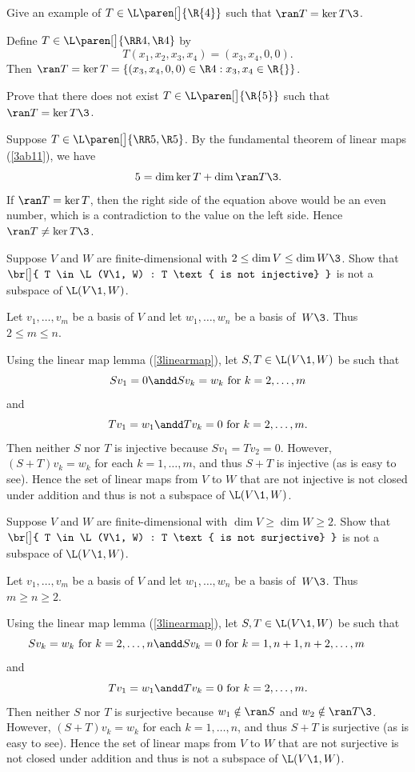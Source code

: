 \exercise
Give an example of $T \in \L\paren[\big]{\R{4}}$ such that $\ran T = \ker T\3$.

\begin{Solution}
Define $T \in \L\paren[\big]{\RR4, \R4}$ by
\[
T(x_1, x_2, x_3, x_4) = (x_3, x_4, 0, 0).
\]
Then $\ran T = \ker T = \{ (x_3, x_4, 0, 0) \in \R4: x_3, x_4 \in \R{} \}$.
\end{Solution}

\exercise
Prove that there does not exist $T \in \L\paren[\big]{\R{5}}$ such that $\ran T = \ker T\3$.

\begin{Solution}
Suppose $T \in \L\paren[\big]{\RR5, \R5}$. By the fundamental theorem of linear maps (\ref{3ab11}), we have
\[
5 = \dim \ker T + \dim \ran T\3.
\]
If $\ran T = \ker T$, then the right side of the equation above would be an even number, which is a contradiction to the value on the left side. Hence $\ran T \ne \ker T\3$.
\end{Solution}

\exercise
Suppose $V$ and $W$ are finite-dimensional with $2 \le \dim V \le \dim W\3$. Show that
$
\br[\big]{ T \in \L(V\1, W) : T \text{ is not injective} }
$
is not a subspace of $\L(V\1, W)$.

\begin{Solution}
Let $v_1, \dots, v_m$ be a basis of $V$ and let $w_1, \dots, w_n$ be a basis of~$W\3$. Thus $2 \le m \le n$.

Using the linear map lemma (\ref{3linearmap}), let $S, T \in \L(V\1, W)$ be such that
\[
Sv_1 = 0 \andd Sv_k = w_k \text{ for } k = 2, \dots, m
\]
and
\[
Tv_1 = w_1 \andd Tv_k = 0 \text{ for } k = 2, \dots, m.
\]
Then neither $S$ nor $T$ is injective because $Sv_1 = Tv_2 = 0$. However,
$(S+T)v_k = w_k$ for each $k = 1, \dots, m$, and thus $S+T$ is injective (as is easy to see). Hence the set of linear maps from $V$ to $W$ that are not injective is not closed under addition and thus is not a subspace of $\L(V\1,W)$.
\end{Solution}

\exercise
Suppose $V$ and $W$ are finite-dimensional with $\dim V \ge \dim W \ge 2$. Show that
$
\br[\big]{ T \in \L(V\1, W) : T \text{ is not surjective} }
$
is not a subspace of $\L(V\1, W)$.

\begin{Solution}
Let $v_1, \dots, v_m$ be a basis of $V$ and let $w_1, \dots, w_n$ be a basis of~$W\3$. Thus $m \ge n \ge 2$.

Using the linear map lemma (\ref{3linearmap}), let $S, T \in \L(V\1, W)$ be such that
\[
\hspace*{-20bp} %
Sv_k = w_k \text{ for } k = 2, \dots, n \andd Sv_k = 0 \text{ for } k = 1, n+1, n+2, \dots, m
\]
and
\[
Tv_1 = w_1 \andd Tv_k = 0 \text{ for } k = 2, \dots, m.
\]
Then neither $S$ nor $T$ is surjective because $w_1 \notin \ran S$ and $w_2 \notin \ran T\3$. However,
$(S+T)v_k = w_k$ for each $k = 1, \dots, n$, and thus $S+T$ is surjective (as is easy to see). Hence the set of linear maps from $V$ to $W$ that are not surjective is not closed under addition and thus is not a subspace of $\L(V\1,W)$.
\end{Solution}

